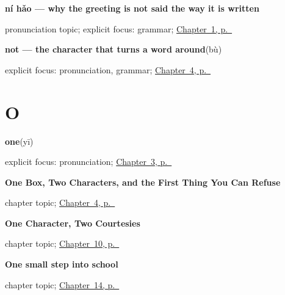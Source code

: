 \noindent\begin{minipage}[t]{\linewidth}
\raggedright
\textbf{ní hǎo — why the greeting is not said the way it is written}\par
\footnotesize pronunciation topic; explicit focus: grammar; \hyperref[ch:zh-nihao]{Chapter~1, p.~\pageref*{ch:zh-nihao}}
\end{minipage}\par\smallskip

\noindent\begin{minipage}[t]{\linewidth}
\raggedright
\textbf{not — the character that turns a word around}\enspace\emph{}\enspace(bù)\par
\footnotesize explicit focus: pronunciation, grammar; \hyperref[ch:zh-negation]{Chapter~4, p.~\pageref*{ch:zh-negation}}
\end{minipage}\par\smallskip

\section*{O}

\noindent\begin{minipage}[t]{\linewidth}
\raggedright
\textbf{one}\enspace\emph{}\enspace(yī)\par
\footnotesize explicit focus: pronunciation; \hyperref[ch:zh-numbers]{Chapter~3, p.~\pageref*{ch:zh-numbers}}
\end{minipage}\par\smallskip

\noindent\begin{minipage}[t]{\linewidth}
\raggedright
\textbf{One Box, Two Characters, and the First Thing You Can Refuse}\par
\footnotesize chapter topic; \hyperref[ch:zh-negation]{Chapter~4, p.~\pageref*{ch:zh-negation}}
\end{minipage}\par\smallskip

\noindent\begin{minipage}[t]{\linewidth}
\raggedright
\textbf{One Character, Two Courtesies}\par
\footnotesize chapter topic; \hyperref[ch:zh-xiexie]{Chapter~10, p.~\pageref*{ch:zh-xiexie}}
\end{minipage}\par\smallskip

\noindent\begin{minipage}[t]{\linewidth}
\raggedright
\textbf{One small step into school}\par
\footnotesize chapter topic; \hyperref[ch:zh-primary-three]{Chapter~14, p.~\pageref*{ch:zh-primary-three}}
\end{minipage}\par\smallskip

